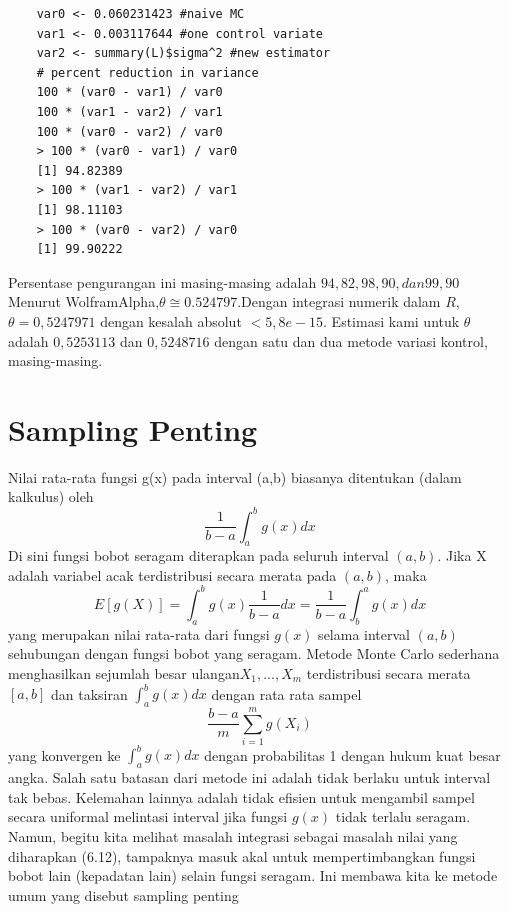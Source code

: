 \documentclass[a4paper,12pt]{article}
\theoremstyle{definition}
\begin{document}
\begin{lstlisting}
    var0 <- 0.060231423 #naive MC
    var1 <- 0.003117644 #one control variate
    var2 <- summary(L)$sigma^2 #new estimator
    # percent reduction in variance
    100 * (var0 - var1) / var0
    100 * (var1 - var2) / var1
    100 * (var0 - var2) / var0
    > 100 * (var0 - var1) / var0
    [1] 94.82389
    > 100 * (var1 - var2) / var1
    [1] 98.11103
    > 100 * (var0 - var2) / var0
    [1] 99.90222
\end{lstlisting}
Persentase pengurangan ini masing-masing adalah $94,82, 98,90, dan 99,90$
Menurut WolframAlpha,$\theta\cong 0.524797$.Dengan integrasi numerik dalam $R$,$\theta=0,5247971$ dengan kesalah absolut $<5,8e-15$. Estimasi kami untuk $\theta$ adalah $0,5253113$ dan $0,5248716$ dengan satu dan dua metode variasi kontrol, masing-masing.
\section{Sampling Penting}
Nilai rata-rata fungsi g(x) pada interval (a,b) biasanya ditentukan (dalam kalkulus) oleh
\begin{equation*}
    \frac{1}{b-a}\int_{a}^{b}g(x)dx
\end{equation*}
Di sini fungsi bobot seragam diterapkan pada seluruh interval $(a,b)$. Jika X adalah variabel acak terdistribusi secara merata pada $(a,b)$, maka
\begin{equation}
    E\left [ g(X) \right ]=\int_{a}^{b}g(x)\frac{1}{b-a}dx=\frac{1}{b-a}\int_{b}^{a}g(x)dx
\end{equation}
yang merupakan nilai rata-rata dari fungsi $g(x)$ selama interval $(a, b)$ sehubungan dengan fungsi bobot yang seragam. Metode Monte Carlo sederhana menghasilkan sejumlah besar ulangan$X_{1},...,X_{m}$ terdistribusi secara merata $[a, b]$ dan taksiran $\int_{a}^{b}g(x)dx$ dengan rata rata sampel
\begin{equation*}
    \frac{b-a}{m}\sum_{i=1}^{m}g(X_{i})
\end{equation*}
yang konvergen ke $\int_{a}^{b}g(x)dx$ dengan probabilitas 1 dengan hukum kuat besar angka. Salah satu batasan dari metode ini adalah tidak berlaku untuk interval tak bebas. Kelemahan lainnya adalah tidak efisien untuk mengambil sampel secara uniformal melintasi interval jika fungsi $g(x)$ tidak terlalu seragam.
Namun, begitu kita melihat masalah integrasi sebagai masalah nilai yang diharapkan (6.12), tampaknya masuk akal untuk mempertimbangkan fungsi bobot lain (kepadatan lain) selain fungsi seragam. Ini membawa kita ke metode umum yang disebut sampling penting
\end{document}
